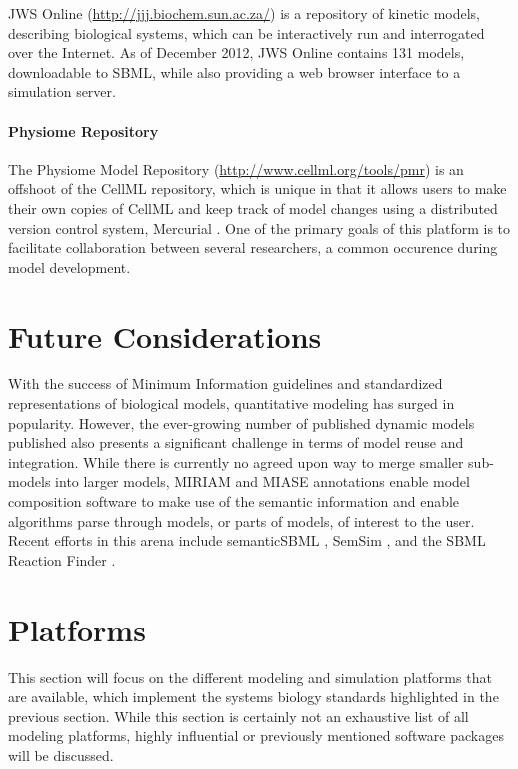 JWS Online (\url{http://jjj.biochem.sun.ac.za/})
\autocite{olivier2004web} is a repository of kinetic models, describing
biological systems, which can be interactively run and interrogated over
the Internet. As of December 2012, JWS Online contains 131 models,
downloadable to SBML, while also providing a web browser interface to a
simulation server.

\paragraph{Physiome Repository}

The Physiome Model Repository (\url{http://www.cellml.org/tools/pmr})
\autocite{yu2011physiome} is an offshoot of the CellML repository, which
is unique in that it allows users to make their own copies of CellML and
keep track of model changes using a distributed version control system,
Mercurial \autocite{o2007distributed}. One of the primary goals of this
platform is to facilitate collaboration between several researchers, a
common occurence during model development.

\section{Future Considerations}

With the success of Minimum Information guidelines and standardized
representations of biological models, quantitative modeling has surged
in popularity. However, the ever-growing number of published dynamic
models published also presents a significant challenge in terms of model
reuse and integration. While there is currently no agreed upon way to
merge smaller sub- models into larger models, MIRIAM and MIASE
annotations enable model composition software to make use of the
semantic information and enable algorithms parse through models, or
parts of models, of interest to the user. Recent efforts in this arena
include semanticSBML \autocite{krause2010annotation}, SemSim
\autocite{neal2009advances}, and the SBML Reaction Finder
\autocite{neal2012sbml}.

\section{Platforms}

This section will focus on the different modeling and simulation
platforms that are available, which implement the systems biology
standards highlighted in the previous section. While this section is
certainly not an exhaustive list of all modeling platforms, highly
influential or previously mentioned software packages will be discussed.

